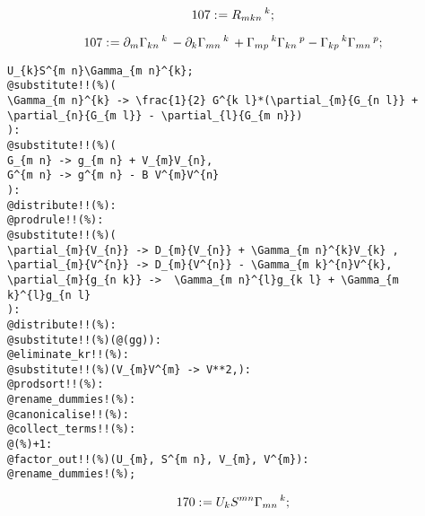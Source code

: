 \documentclass[11pt]{article}
\def\specialcolon{\mathrel{\mathop{:}}\hspace{-.5em}}
\begin{document}
\begin{dmath*}[compact, spread=2pt]
107\specialcolon{}= {R}_{m k n}\,^{k};
\end{dmath*}





\begin{dmath*}[compact, spread=2pt]
107\specialcolon{}= {\partial}_{m}{{\Gamma}_{k n}\,^{k}}\,  - {\partial}_{k}{{\Gamma}_{m n}\,^{k}}\,  + {\Gamma}_{m p}\,^{k} {\Gamma}_{k n}\,^{p} - {\Gamma}_{k p}\,^{k} {\Gamma}_{m n}\,^{p};
\end{dmath*}
{\color[named]{Blue}\begin{verbatim}
U_{k}S^{m n}\Gamma_{m n}^{k};
@substitute!!(%)(
\Gamma_{m n}^{k} -> \frac{1}{2} G^{k l}*(\partial_{m}{G_{n l}} + \partial_{n}{G_{m l}} - \partial_{l}{G_{m n}})
):
@substitute!!(%)(
G_{m n} -> g_{m n} + V_{m}V_{n},
G^{m n} -> g^{m n} - B V^{m}V^{n}
):
@distribute!!(%):
@prodrule!!(%):
@substitute!!(%)(
\partial_{m}{V_{n}} -> D_{m}{V_{n}} + \Gamma_{m n}^{k}V_{k} ,
\partial_{m}{V^{n}} -> D_{m}{V^{n}} - \Gamma_{m k}^{n}V^{k},
\partial_{m}{g_{n k}} ->  \Gamma_{m n}^{l}g_{k l} + \Gamma_{m k}^{l}g_{n l}
):
@distribute!!(%):
@substitute!!(%)(@(gg)):
@eliminate_kr!!(%):
@substitute!!(%)(V_{m}V^{m} -> V**2,):
@prodsort!!(%):
@rename_dummies!(%):
@canonicalise!!(%):
@collect_terms!!(%):
@(%)+1:
@factor_out!!(%)(U_{m}, S^{m n}, V_{m}, V^{m}):
@rename_dummies!(%);
\end{verbatim}}





\begin{dmath*}[compact, spread=2pt]
170\specialcolon{}= {U}_{k} {S}^{m n} {\Gamma}_{m n}\,^{k};
\end{dmath*}
\end{document}
